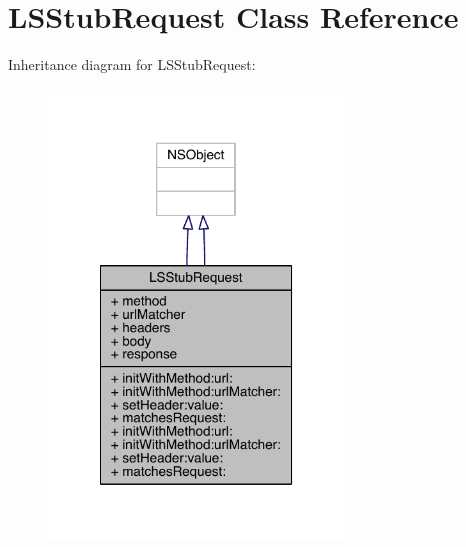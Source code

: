 \hypertarget{interface_l_s_stub_request}{\section{L\-S\-Stub\-Request Class Reference}
\label{interface_l_s_stub_request}
}


Inheritance diagram for L\-S\-Stub\-Request\-:\nopagebreak
\begin{figure}[H]
\begin{center}
\leavevmode
\includegraphics[width=222pt]{interface_l_s_stub_request__inherit__graph}
\end{center}
\end{figure}


